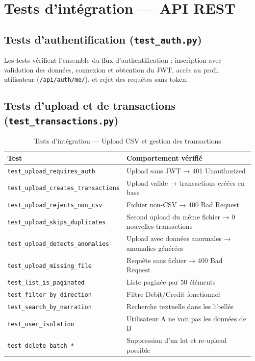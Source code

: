 \documentclass[12pt,a4paper]{report}
\begin{document}
\section{Tests d'intégration — API REST}

\subsection{Tests d'authentification (\texttt{test\_auth.py})}

Les tests vérifient l'ensemble du flux d'authentification : inscription
avec validation des données, connexion et obtention du JWT, accès au
profil utilisateur (\texttt{/api/auth/me/}), et rejet des requêtes
sans token.

\subsection{Tests d'upload et de transactions (\texttt{test\_transactions.py})}

\begin{table}[H]
  \centering
  \caption{Tests d'intégration — Upload CSV et gestion des transactions}
  \label{tab:tests-transactions}
  \renewcommand{\arraystretch}{1.3}
  \begin{tabularx}{\textwidth}{lX}
    \toprule
    Test & Comportement vérifié \\
    \midrule
    \texttt{test\_upload\_requires\_auth} & Upload sans JWT → 401 Unauthorized \\
    \texttt{test\_upload\_creates\_transactions} & Upload valide → transactions créées en base \\
    \texttt{test\_upload\_rejects\_non\_csv} & Fichier non-CSV → 400 Bad Request \\
    \texttt{test\_upload\_skips\_duplicates} & Second upload du même fichier → 0 nouvelles transactions \\
    \texttt{test\_upload\_detects\_anomalies} & Upload avec données anormales → anomalies générées \\
    \texttt{test\_upload\_missing\_file} & Requête sans fichier → 400 Bad Request \\
    \texttt{test\_list\_is\_paginated} & Liste paginée par 50 éléments \\
    \texttt{test\_filter\_by\_direction} & Filtre Debit/Credit fonctionnel \\
    \texttt{test\_search\_by\_narration} & Recherche textuelle dans les libellés \\
    \texttt{test\_user\_isolation} & Utilisateur A ne voit pas les données de B \\
    \texttt{test\_delete\_batch\_*} & Suppression d'un lot et re-upload possible \\
    \bottomrule
  \end{tabularx}
\end{table}
\end{document}
